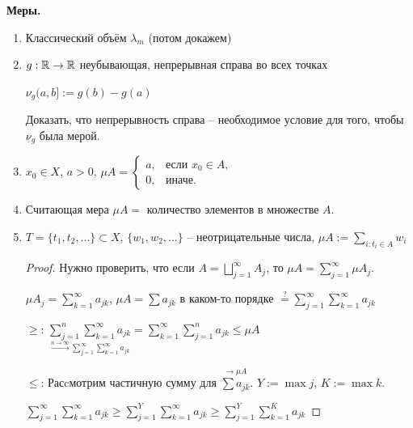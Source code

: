 \begin{example}
    \textbf{Меры.}
    \begin{enumerate}
        \item Классический объём $\lambda_m$ (потом докажем)
        \item $g: \mathbb{R} \rightarrow \mathbb{R}$ неубывающая, непрерывная справа во всех точках
        
        $\nu_g(a, b]:=g(b) - g(a)$

        \begin{exercise}
            Доказать, что непрерывность справа – необходимое условие для того,
            чтобы $\nu_g$ была мерой.
        \end{exercise}

        \item $x_0\in X$, $a>0$, $\mu A=\left\{\begin{array}{ll}
            a, & \text{если } x_0\in A, \\
            0, & \text{иначе.}
        \end{array}\right.$
        \item Считающая мера $\mu A=$ количество элементов в множестве $A$.
        \item $T=\{t_1, t_2, ...\}\subset X$, $\{w_1, w_2, ...\}$ –  неотрицательные числа, $\mu A:=\sum\limits_{i:t_i\in A}w_i$

        \begin{proof}
            Нужно проверить, что если $A=\bigsqcup\limits_{j=1}^\infty A_j$, то $\mu A = \sum \limits_{j=1}^\infty\mu  A_j$. 
            
            $\mu  A_j=\sum \limits_{k=1}^\infty a_{jk}$, $\mu A = \sum a_{jk}$ в каком-то порядке $\underset{}{\overset{?}{=}}\sum \limits_{j=1}^\infty \sum \limits_{k=1}^\infty a_{jk}$

            $\geq$: $\underset{\overset{n\rightarrow \infty}{\rightarrow} \sum \limits_{j=1}^\infty\sum \limits_{k=1}^\infty a_{jk}}{\sum \limits_{j=1}^n\sum \limits_{k=1}^\infty a_{jk}}=\sum \limits_{k=1}^\infty\sum \limits_{j=1}^n a_{jk} \leq \mu A$

            $\leq$: Расcмотрим частичную сумму для $\overset{\rightarrow \mu A}{\sum a_{jk}}$. $Y := \max j$, $K := \max k$.

            $\sum \limits_{j=1}^\infty\sum \limits_{k=1}^\infty a_{jk}\geq \sum \limits_{j=1}^Y\sum \limits_{k=1}^\infty a_{jk}\geq \sum \limits_{j=1}^Y\sum \limits_{k=1}^K a_{jk}$

        \end{proof}
    \end{enumerate}
\end{example}

